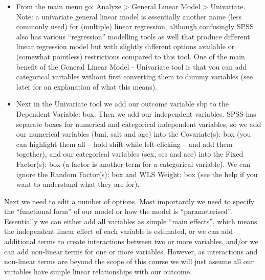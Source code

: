 \documentclass[
]{book}
\begin{document}
\begin{itemize}
\item
  From the main menu go: Analyze \textgreater{} General Linear Model \textgreater{} Univariate. Note: a univariate general linear model is essentially another name (less commonly used) for (multiple) linear regression, although confusingly SPSS also has various ``regression'' modelling tools as well that produce different linear regression model but with slightly different options available or (somewhat pointless) restrictions compared to this tool. One of the main benefit of the General Linear Model - Univariate tool is that you can add categorical variables without first converting them to dummy variables (see later for an explanation of what this means).
\item
  Next in the Univariate tool we add our outcome variable sbp to the Dependent Variable: box. Then we add our independent variables. SPSS has separate boxes for numerical and categorical independent variables, so we add our numerical variables (bmi, salt and age) into the Covariate(s): box (you can highlight them all -- hold shift while left-clicking -- and add them together), and our categorical variables (sex, ses and ace) into the Fixed Factor(s): box (a factor is another term for a categorical variable). We can ignore the Random Factor(s): box and WLS Weight: box (see the help if you want to understand what they are for).
\end{itemize}

Next we need to edit a number of options. Most importantly we need to specify the ``functional form'' of our model or how the model is ``parameterised''. Essentially we can either add all variables as simple ``main effects'', which means the independent linear effect of each variable is estimated, or we can add additional terms to create interactions between two or more variables, and/or we can add non-linear terms for one or more variables. However, as interactions and non-linear terms are beyond the scope of this course we will just assume all our variables have simple linear relationships with our outcome.
\end{document}
